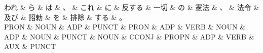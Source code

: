 \documentclass[tikz,border=5pt]{standalone}
\begin{document}
\normalsize
\begin{dependency}[edge unit distance=12.0pt]
    \begin{deptext}[column sep=1em]
        われ \& ら \& は \& 、 \& これ \& に \& 反する \& 一切 \& の \& 憲法 \& 、 \& 法令 \& 及び \& 詔勅 \& を \& 排除 \& する \& 。\\
        PRON \& NOUN \& ADP \& PUNCT \& PRON \& ADP \& VERB \& NOUN \& ADP \& NOUN \& PUNCT \& NOUN \& CCONJ \& PROPN \& ADP \& VERB \& AUX \& PUNCT\\
    \end{deptext}
\end{dependency}
\end{document}
